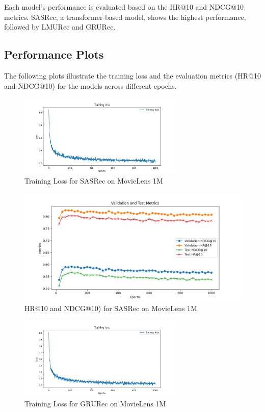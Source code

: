 \documentclass{article}
\begin{document}
Each model's performance is evaluated based on the HR@10 and NDCG@10 metrics. SASRec, a transformer-based model, shows the highest performance, followed by LMURec and GRURec.



\subsection{Performance Plots}
 The following plots illustrate the training loss and the evaluation metrics (HR@10 and NDCG@10) for the models across different epochs.

\begin{figure}[h!]
    \centering
    \includegraphics[width=0.7\textwidth]{plots/SASRec_ml-1m_training_loss.png}
    
    \caption{Training Loss for SASRec on MovieLens 1M}
    \label{fig:sasrec_loss}
\end{figure}

\begin{figure}
    \centering
    \includegraphics[width=0.7\linewidth]{plots/SASRec_ml-1m_metrics.png}
    \caption{HR@10 and NDCG@10) for SASRec on MovieLens 1M}
    \label{fig:enter-label}
\end{figure}


\begin{figure}[h!]
    \centering
    \includegraphics[width=0.7\textwidth]{plots/GRURec_ml-1m_training_loss.png}
    
    \caption{Training Loss for GRURec on MovieLens 1M}
    \label{fig:sasrec_loss}
\end{figure}
\end{document}
